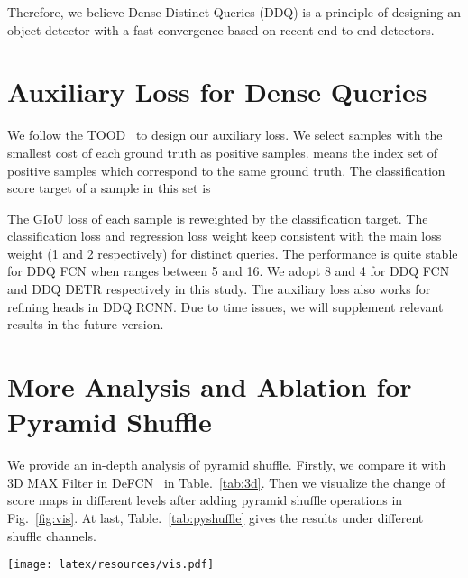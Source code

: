 \documentclass[10pt,twocolumn,letterpaper]{article}
\begin{document}
Therefore, we believe Dense Distinct Queries (DDQ) is a principle of designing an object detector with a fast convergence based on recent end-to-end detectors. 



\section{Auxiliary Loss for Dense Queries}
\label{sec:loss}
We follow the  TOOD~\cite{feng2021tood}  to design our auxiliary loss. We select  samples with the smallest cost of each ground truth as positive samples.  means the index set of positive samples which correspond to the same ground truth. The classification score target of a sample  in this set
is 



The GIoU loss of each sample is reweighted by the classification target. The classification loss and regression loss weight keep consistent with the main loss weight (1 and 2 respectively) for distinct queries. The performance is quite stable for DDQ FCN when  ranges between 5 and 16. We adopt 8 and 4 for DDQ FCN and DDQ DETR respectively in this study. The auxiliary loss also works for refining heads in DDQ RCNN. Due to time issues, we will supplement relevant results in the future version.


\section{More Analysis and Ablation for Pyramid Shuffle}
\label{sec:ana_py}
We provide an in-depth analysis of pyramid shuffle. Firstly, we compare it with 3D MAX Filter in DeFCN~\cite{wang2021end} in Table.~\ref{tab:3d}. Then we visualize the change of score maps in different levels after adding pyramid shuffle operations in Fig.~\ref{fig:vis}. At last, Table.~\ref{tab:pyshuffle} gives the results under different shuffle channels.


 \begin{figure*}[t]
    \centering
    \texttt{[image: latex/resources/vis.pdf]}
      \caption{
    \textbf{Visualization of score map of adjacent levels}. We visualize classification scores with the rainbow color system.  The left side of each subfigure(with blue background) shows score maps with pyramid shuffles, and the corresponding right side (with yellow background) means without pyramid shuffles. The top-left corner marks the feature level. The red circle represents the duplication predictions in the adjacent level.}
    
    \label{fig:vis}
\end{figure*}
\end{document}

